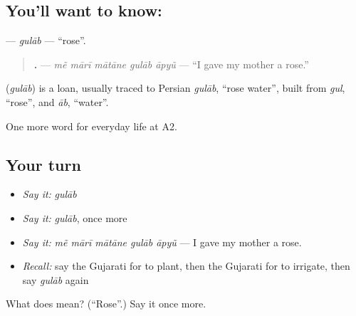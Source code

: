 \subsection*{You'll want to know: }
\textbf{} — \emph{gulāb} — \textquotedblleft{}rose\textquotedblright{}.

\begin{quote}
\textbf{    .} — \emph{mẽ mārī mātāne gulāb āpyũ} — \textquotedblleft{}I gave my mother a rose.\textquotedblright{}
\end{quote}

\begin{cousinweb}
\textbf{} (\emph{gulāb}) is a loan, usually traced to Persian \emph{gulāb}, \textquotedblleft{}rose water\textquotedblright{}, built from \emph{gul}, \textquotedblleft{}rose\textquotedblright{}, and \emph{āb}, \textquotedblleft{}water\textquotedblright{}.
\end{cousinweb}

\begin{grammarlens}[title={What you've built}]
One more word for everyday life at A2.
\end{grammarlens}

\subsection*{Your turn}
\begin{itemize}
\raggedright
  \item \emph{Say it:} \emph{gulāb}
  \item \emph{Say it:} \emph{gulāb}, once more
  \item \emph{Say it:} \emph{mẽ mārī mātāne gulāb āpyũ} — I gave my mother a rose.
  \item \emph{Recall:} say the Gujarati for to plant, then the Gujarati for to irrigate, then say \emph{gulāb} again
\end{itemize}

\begin{tcolorbox}[breakable,colback=teal!4,colframe=teal!35!black,title={Before you move on}]
What does  mean? (\textquotedblleft{}Rose\textquotedblright{}.) Say it once more.
\end{tcolorbox}
